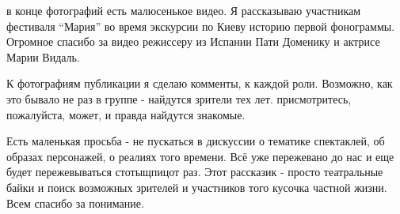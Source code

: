 в конце фотографий есть малюсенькое видео. Я рассказываю участникам фестиваля
\enquote{Мария} во время экскурсии по Киеву историю первой фонограммы. Огромное спасибо
за видео режиссеру из Испании Пати Доменику  и актрисе Марии Видаль. 

К фотографиям публикации я сделаю комменты, к каждой роли. Возможно, как это
бывало не раз в группе - найдутся зрители тех лет. присмотритесь, пожалуйста,
может, и правда найдутся знакомые.

Есть маленькая просьба - не пускаться в дискуссии о тематике спектаклей, об
образах персонажей, о реалиях того времени. Всё уже пережевано до нас и еще
будет пережевываться стотыщпицот раз. Этот рассказик - просто театральные байки
и поиск возможных зрителей и участников того кусочка частной жизни. Всем
спасибо за понимание.

